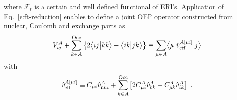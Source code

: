 %
where ${\mathcal{F}}_t$ is a certain and well defined functional of ERI's.
Application of Eq.~\eqref{e:ft-reduction} enables to define
a joint OEP
operator constructed from nuclear, Coulomb and exchange parts 
as
%
\begin{equation}
 V^A_{ij} + 
 \sum_{k\in A}^{\rm Occ} 
  \left\{ 2\bigl\langle {ij} \bigl\lvert {kk} \bigr\rangle - \bigl\langle {ik} \bigl\lvert {jk} \bigr\rangle \right\}
\equiv \sum_{\mu\in A} \bigl\langle {\mu} \bigl\lvert { 
\hat{v}^{A[\mu i]}_{\rm eff}
 } \bigl\lvert {j} \bigr\rangle
\end{equation}
%
with
%
\begin{equation}
 \hat{v}^{A[\mu i]}_{\rm eff} \equiv C_{\mu i} \hat{v}^A_{\rm nuc} + 
 \sum_{k\in A}^{\rm Occ} \left[
 2C_{\mu i}^A \hat{v}^A_{kk} - C_{\mu k}^A \hat{v}^A_{ik}
 \right] \;.
\end{equation}
%
%
%
